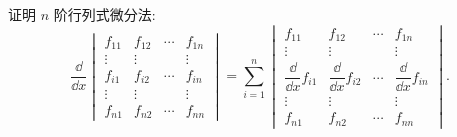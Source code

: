 \begin{example}
    \label{n jie hang lie shi wei fen fa}
    证明 $n$ 阶行列式微分法:
    $$\frac{\dd  }{\dd  x} \begin{vmatrix}
            f_{11} & f_{12} & \cdots & f_{1n} \\
            \vdots & \vdots &        & \vdots \\
            f_{i1} & f_{i2} & \cdots & f_{in} \\
            \vdots & \vdots &        & \vdots \\
            f_{n1} & f_{n2} & \cdots & f_{nn}
        \end{vmatrix}=\sum_{i=1}^{n}
        \begin{vmatrix}
            f_{11}                       & f_{12}                      & \cdots & f_{1n}                       \\
            \vdots                       & \vdots                      &        & \vdots                       \\
            \dfrac{\dd  }{\dd x } f_{i1} & \dfrac{\dd  }{\dd x }f_{i2} & \cdots & \dfrac{\dd  }{\dd x } f_{in} \\
            \vdots                       & \vdots                      &        & \vdots                       \\
            f_{n1}                       & f_{n2}                      & \cdots & f_{nn}
        \end{vmatrix}.$$
\end{example}
